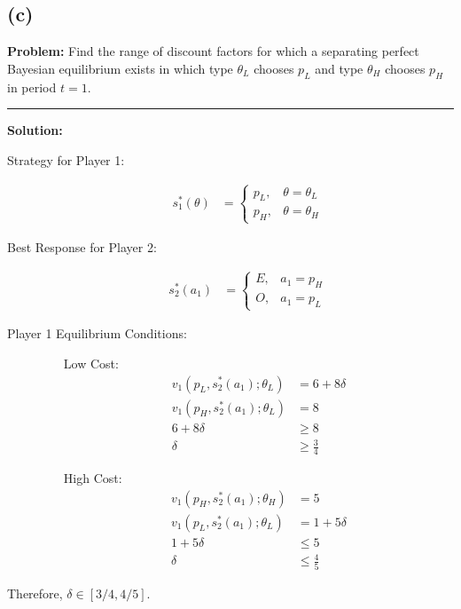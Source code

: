 \documentclass[10pt]{extarticle}
\begin{document}
    \subsection{(c)}%
    \textbf{Problem:} Find the range of discount factors for which a separating perfect Bayesian equilibrium exists in which type $\theta_L$ chooses $p_L$ and type $\theta_H$ chooses $p_H$ in period $t=1$.
    \begin{center}
    \rule{\textwidth}{0.4pt}
    \end{center}
    \textbf{Solution:}
    \begin{description}
      \item[Strategy for Player 1:]
        \begin{align*}
          s_1^{\ast}(\theta) &= \begin{cases}
            p_L,&\theta = \theta_L\\
            p_H,&\theta=\theta_H
          \end{cases}
        \end{align*}
      \item[Best Response for Player 2:]
        \begin{align*}
          s_2^{\ast}(a_1) &= \begin{cases}
            E,&a_1 = p_H\\
            O,&a_1=p_L
          \end{cases}
        \end{align*}
      \item[Player 1 Equilibrium Conditions:]\hfill
        \begin{itemize}
          \item[Low Cost:]
            \begin{align*}
              v_1(p_L,s_2^{\ast}(a_1);\theta_L) &= 6 + 8\delta\\
              v_1(p_H,s_2^{\ast}(a_1);\theta_L) &= 8\\
              6 + 8\delta &\geq 8\\
              \delta &\geq \frac{3}{4}
            \end{align*}
          \item[High Cost:]
            \begin{align*}
              v_1(p_H,s_2^{\ast}(a_1);\theta_H) &= 5\\
              v_1(p_L,s_2^{\ast}(a_1);\theta_L) &= 1 + 5\delta\\
              1 + 5\delta &\leq 5\\
              \delta &\leq \frac{4}{5}
            \end{align*}
        \end{itemize}
    \end{description}
    Therefore, $\delta \in [3/4,4/5]$.
    \pagebreak
\end{document}
